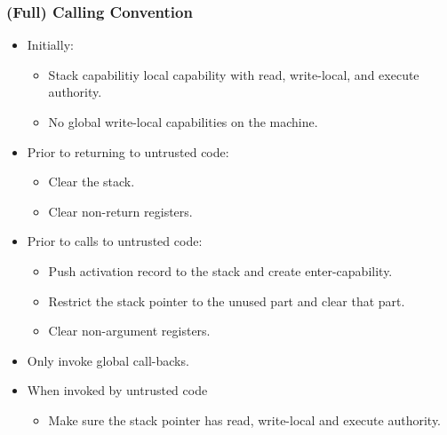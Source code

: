 \documentclass{beamer}
\begin{document}
\begin{frame}
  \frametitle{(Full) Calling Convention}
  \begin{itemize}
  \item Initially:
    \begin{itemize}
    \item Stack capabilitiy local capability with read, write-local, and execute authority.
    \item No global write-local capabilities on the machine.
    \end{itemize}
  \item Prior to returning to untrusted code:
    \begin{itemize}
    \item Clear the stack.
    \item Clear non-return registers.
    \end{itemize}
  \item Prior to calls to untrusted code:
    \begin{itemize}
    \item Push activation record to the stack and create enter-capability.
    \item Restrict the stack pointer to the unused part and clear that part.
    \item Clear non-argument registers.
    \end{itemize}
  \item Only invoke global call-backs.
  \item When invoked by untrusted code
    \begin{itemize}
    \item Make sure the stack pointer has read, write-local and execute authority.
    \end{itemize}
  \end{itemize}
\end{frame}
\end{document}
